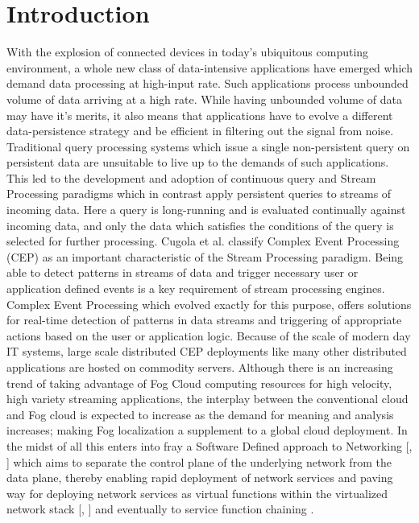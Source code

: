 \chapter{Introduction} 
With the explosion of connected devices in today's ubiquitous computing environment, a whole new class of data-intensive applications have emerged which demand data processing at high-input rate. Such applications process unbounded volume of data arriving at a high rate. While having unbounded volume of data may have it's merits, it also means that applications have to evolve a different data-persistence strategy and be efficient in filtering out the signal from noise. Traditional query processing systems which issue a single non-persistent query on persistent data are unsuitable to live up to the demands of such applications. This led to the development and adoption of continuous query \cite{Chen} and Stream Processing \cite{chakravarthy} paradigms which in contrast apply persistent queries to streams of incoming data. Here a query is long-running and is evaluated continually against incoming data, and only the data which satisfies the conditions of the query is selected for further processing. Cugola et al. \cite{cugola2012processing} classify Complex Event Processing (CEP) as an important characteristic of the Stream Processing paradigm. Being able to detect patterns in streams of data and trigger necessary user or application defined events is a key requirement of stream processing engines. Complex Event Processing which evolved exactly for this purpose, offers solutions for real-time detection of patterns in data streams and triggering of appropriate actions based on the user or application logic. 
\newline \newline
Because of the scale of modern day IT systems, large scale distributed CEP deployments like many other distributed applications are hosted on commodity servers. Although there is an increasing trend of taking advantage of Fog Cloud computing resources \cite{bonomi2012fog} for high velocity, high variety streaming applications, the interplay between the conventional cloud and Fog cloud is expected to increase as the demand for meaning and analysis increases; making Fog localization a supplement to a global cloud  deployment.  
In the midst of all this enters into fray a Software Defined approach to Networking [\cite{Jain}, \cite{casado}] which aims to separate the control plane of the underlying network from the data plane, thereby enabling rapid deployment of network services and paving way for deploying network services as virtual functions within the virtualized network stack [\cite{sherwood2009flowvisor},\cite{han2015network} ] and eventually to service function chaining \cite{halpern2015service}. 

